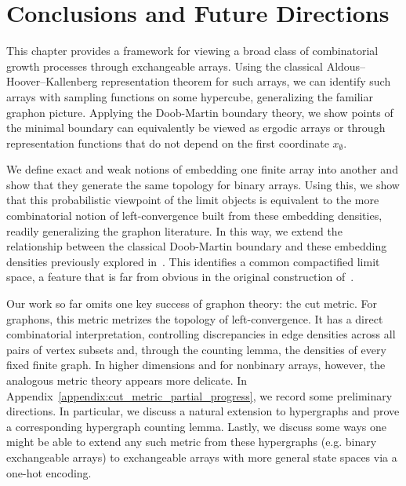 \section{Conclusions and Future Directions}

This chapter provides a framework for viewing a broad class of combinatorial
growth processes through exchangeable arrays. Using the classical Aldous--Hoover--Kallenberg
representation theorem for such arrays, we can identify such arrays with sampling functions
on some hypercube, generalizing the familiar graphon picture. Applying the Doob-Martin boundary
theory, we show points of the minimal boundary can equivalently be viewed as
ergodic arrays or through representation functions that do not depend on the first
coordinate $x_\emptyset$.

We define exact and weak notions of embedding one finite array into another
and show that they generate the same topology for binary arrays. Using this,
we show that this probabilistic viewpoint of the limit objects is equivalent to the
more combinatorial notion of left-convergence built from these embedding densities, readily generalizing the graphon literature.
In this way, we extend the relationship between the classical Doob-Martin boundary and these embedding
densities previously explored in~\cite{grubel2015_persisting_randomness_graphs_search_trees,grubel2023_ranks_copulas_permutons}.
This identifies a common compactified limit space, a feature that is far from obvious in the original
construction of~\cite{lovasz2004_limits_dense_graph_sequences}.

Our work so far omits one key success of graphon theory: the cut metric. For graphons, this metric metrizes
the topology of left-convergence. It has a direct combinatorial interpretation, controlling discrepancies
in edge densities across all pairs of vertex subsets and, through the counting lemma, the densities of every
fixed finite graph. In higher dimensions and for nonbinary arrays, however, the analogous metric theory appears more delicate.
In Appendix~\ref{appendix:cut_metric_partial_progress}, we record some preliminary directions. In particular, we
discuss a natural extension to hypergraphs and prove a corresponding hypergraph counting lemma. Lastly, we discuss some ways one might be able
to extend any such metric from these hypergraphs (e.g. binary exchangeable arrays) to exchangeable arrays with more general
state spaces via a one-hot encoding.




